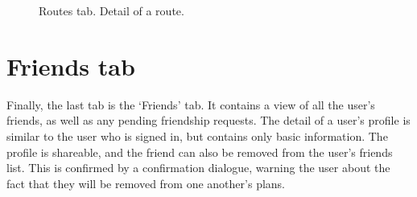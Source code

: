 \begin{figure}[h!]
    \centering
    \hfill
    \hfill
    \caption{Routes tab. Detail of a route.}
    \label{fig:routes}
\end{figure}

\section{Friends tab}
Finally, the last tab is the `Friends' tab.
It contains a view of all the user's friends, as well as any pending friendship requests.
The detail of a user's profile is similar to the user who is signed in, but contains only basic information.
The profile is shareable, and the friend can also be removed from the user's friends list.
This is confirmed by a confirmation dialogue, warning the user about the fact that they will be removed from one another's plans.

